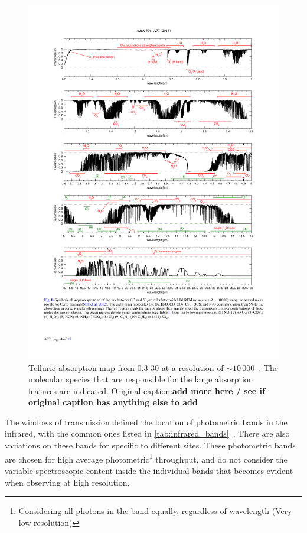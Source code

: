 \begin{figure}
    \centering
    \includegraphics[width=0.9\linewidth]{figures/atmos_and_models/cropped_molecfit_absorption}
    \caption{Telluric absorption map from 0.3-30\um{} at a resolution of $\sim 10\,000$~\citet[][Figure~1]{smette_molecfit_2015}.
The molecular species that are responsible for the large absorption features are indicated.
        Original caption:\textbf{add more here / see if original caption has anything else to add}}
    \label{fig:croppedmolecfitabsorbtion}
\end{figure}

The windows of transmission defined the location of photometric bands in the infrared, with the common ones listed in \cref{tab:infrared_bands}~\citep[see e.g.][]{sterken_astronomical_1992, binney_galactic_1998}.
There are also variations on these bands for specific to different sites.
These photometric bands are chosen for high average photometric\footnote{Considering all photons in the band equally, regardless of wavelength (Very low resolution)} throughput, and do not consider the variable spectroscopic content inside the individual bands that becomes evident when observing at high resolution.

